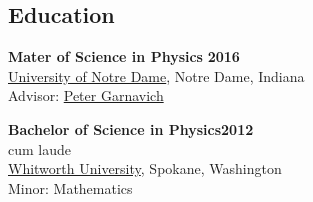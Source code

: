 \documentclass[margin]{res}
\begin{document}
\begin{resume}
\section{Education}

{\bf Mater of Science in Physics} \hfill  {\bf 2016}\\
\href{http://physics.nd.edu}{University of Notre Dame}, Notre Dame, Indiana \\ 
Advisor: \href{www.nd.edu/~pgarnavi}{Peter Garnavich}


{\bf Bachelor of Science in Physics\hfill 2012 }\\
cum laude\\%
\href{http://www.whitworth.edu/physics/}{Whitworth University}, Spokane, Washington \\ 
Minor: Mathematics
 



\end{resume}
\end{document}
